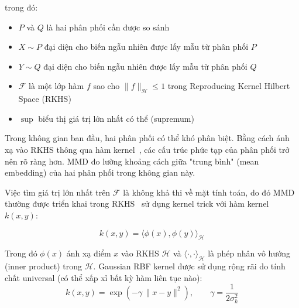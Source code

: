 trong đó:
\begin{itemize}
	\item $P$ và $Q$ là hai phân phối cần được so sánh
	\item $X \sim P$ đại diện cho biến ngẫu nhiên được lấy mẫu từ phân phối $P$
	\item $Y \sim Q$ đại diện cho biến ngẫu nhiên được lấy mẫu từ phân phối $Q$
	\item $\mathcal{F}$ là một lớp hàm $f$ sao cho $\|f\|_{\mathcal{H}} \leq 1$ trong Reproducing Kernel Hilbert Space (RKHS)~\cite{scholkopf2002learning}
	\item $\sup$ biểu thị giá trị lớn nhất có thể (supremum)
\end{itemize}
Trong không gian ban đầu, hai phân phối có thể khó phân biệt. Bằng cách ánh xạ vào RKHS thông qua hàm kernel~\cite{scholkopf2002learning},
các cấu trúc phức tạp của phân phối trở nên rõ ràng hơn. MMD đo lường khoảng cách giữa "trung bình" (mean embedding) của hai phân phối trong không gian này.

Việc tìm giá trị lớn nhất trên $\mathcal{F}$ là không khả thi về mặt tính toán, do đó MMD thường được triển khai trong
RKHS~\cite{scholkopf2002learning} sử dụng kernel trick với hàm kernel $k(x, y)$:

\begin{equation}
	k(x, y) = \langle \phi(x), \phi(y) \rangle_{\mathcal{H}}
\end{equation}

Trong đó $\phi(x)$ ánh xạ điểm $x$ vào RKHS $\mathcal{H}$ và $\langle \cdot, \cdot \rangle_{\mathcal{H}}$ là phép nhân vô hướng (inner product) trong $\mathcal{H}$.
Gaussian RBF kernel được sử dụng rộng rãi do tính chất universal (có thể xấp xỉ bất kỳ hàm liên tục nào):
\begin{equation}
	k(x, y) = \exp\left(-\gamma\, \|x - y\|^2\right), \qquad \gamma = \frac{1}{2\sigma_k^2}
\end{equation}

